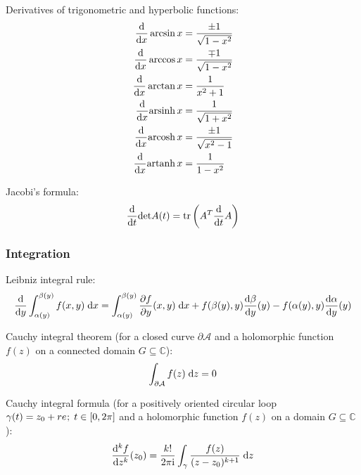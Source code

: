 			\noindent
			Derivatives of trigonometric and hyperbolic functions:
			\begin{equation}
				\begin{split}
					\frac{\mathrm{d}}{\mathrm{d} x}\arcsin x &= \frac{\pm 1}{\sqrt{1-x^2}} \\
					\frac{\mathrm{d}}{\mathrm{d} x}\arccos x &= \frac{\mp 1}{\sqrt{1-x^2}} \\
					\frac{\mathrm{d}}{\mathrm{d} x}\arctan x &= \frac{1}{x^2+1} \\
					\frac{\mathrm{d}}{\mathrm{d} x}\mathrm{arsinh}\,x &= \frac{1}{\sqrt{1+x^2}} \\
					\frac{\mathrm{d}}{\mathrm{d} x}\mathrm{arcosh}\,x &= \frac{\pm 1}{\sqrt{x^2-1}} \\
					\frac{\mathrm{d}}{\mathrm{d} x}\mathrm{artanh}\,x &= \frac{1}{1-x^2} \\
				\end{split}
			\end{equation}

			\noindent
			Jacobi's formula:
			\begin{equation}
				\frac{\mathrm{d} }{\mathrm{d} t}\mathrm{det} A(t) = \mathrm{tr}\left(A^T \frac{\mathrm{d} }{\mathrm{d} t} A\right)
			\end{equation}

		\subsubsection{Integration}
			\noindent
			Leibniz integral rule:
			\begin{equation}
				\frac{\mathrm{d} }{\mathrm{d} y} \int_{\alpha(y)}^{\beta(y)}f(x,y)\;\mathrm{d} x = \int_{\alpha(y)}^{\beta(y)} \frac{\partial f}{\partial y}(x,y)\;\mathrm{d} x + f(\beta(y),y)\frac{\mathrm{d} \beta}{\mathrm{d} y}(y)-f(\alpha(y),y)\frac{\mathrm{d} \alpha}{\mathrm{d} y}(y)
			\end{equation}

			\noindent
			Cauchy integral theorem (for a closed curve $\partial \mathcal{A}$ and a holomorphic function $f(z)$ on a connected domain $G \subseteq \mathbb{C}$):
			\begin{equation}
				\int_{\partial \mathcal{A}} f(z)\;\mathrm{d} z = 0
			\end{equation}

			\noindent
			Cauchy integral formula (for a positively oriented circular loop $\gamma(t)=z_0+re^{\it};\;t\in[0,2\pi]$ and a holomorphic function $f(z)$ on a domain $G \subseteq \mathbb{C}$):
			\begin{equation}
				\frac{\mathrm{d}^k f}{\mathrm{d} z^k}(z_0) = \frac{k!}{2\pi \mathrm{i}} \int_\gamma \frac{f(z)}{(z-z_0)^{k+1}}\;\mathrm{d} z
			\end{equation}

